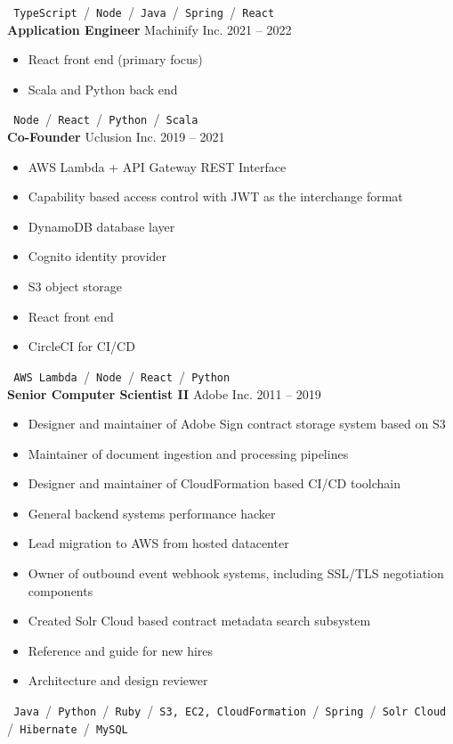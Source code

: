 \documentclass{res}
\begin{document}
        \texttt{ TypeScript }\slash\texttt{ Node }\slash\texttt{ Java }\slash\texttt{ Spring }\slash\texttt{ React } \\

        {\bf Application Engineer} \hfill Machinify Inc. \hfill 2021 -- 2022
        \begin{itemize}
        \item React front end (primary focus)
        \item Scala and Python back end
        \end{itemize}
        \texttt{ Node }\slash\texttt{ React }\slash\texttt{ Python }\slash\texttt{ Scala }\\

        {\bf Co-Founder} \hfill Uclusion Inc. \hfill 2019 -- 2021
        \begin{itemize}
        \item AWS Lambda + API Gateway REST Interface
        \item Capability based access control with JWT as the interchange format
        \item DynamoDB database layer
        \item Cognito identity provider
        \item S3 object storage
        \item React front end
        \item CircleCI for CI/CD
        \end{itemize}
        \texttt{ AWS Lambda }\slash\texttt{ Node }\slash\texttt{ React }\slash\texttt{ Python }\\
        
        {\bf Senior Computer Scientist II} \hfill Adobe Inc. \hfill 2011 -- 2019
        \begin{itemize}
        \item Designer and maintainer of Adobe Sign contract storage system based on S3
        \item Maintainer of document ingestion and processing pipelines
        \item Designer and maintainer of CloudFormation based CI/CD toolchain
        \item General backend systems performance hacker
        \item Lead migration to AWS from hosted datacenter
        \item Owner of outbound event webhook systems, including SSL/TLS negotiation components
        \item Created Solr Cloud based contract metadata search subsystem
        \item Reference and guide for new hires
        \item Architecture and design reviewer
        \end{itemize}
	\texttt{ Java }\slash\texttt{ Python }\slash\texttt{ Ruby }\slash\texttt{ S3, EC2, CloudFormation }\slash\texttt{ Spring }\slash\texttt{ Solr Cloud }\slash\texttt{ Hibernate }\slash\texttt{ MySQL }
        
\end{document}

